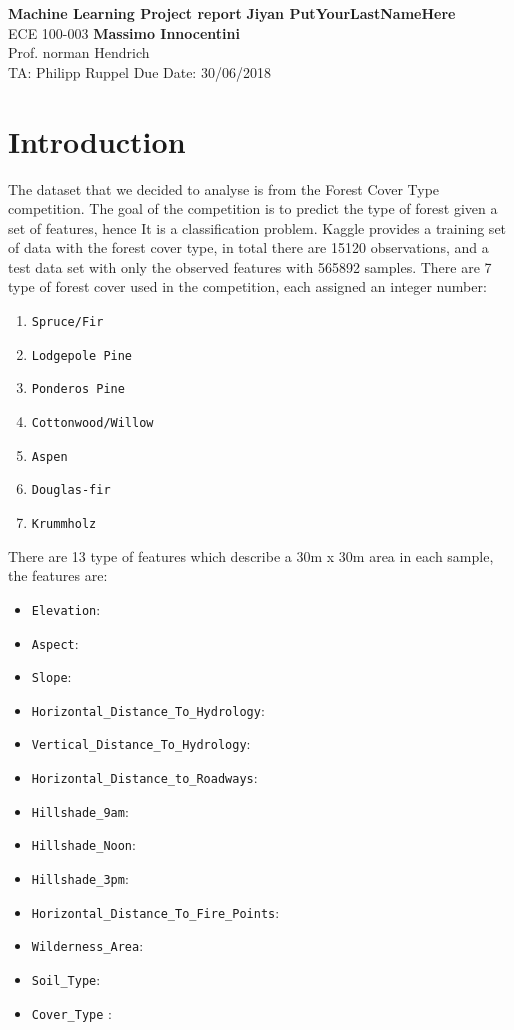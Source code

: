 \documentclass[a4paper, 11pt]{article}
\begin{document}
\noindent
\large\textbf{Machine Learning Project report} \hfill \textbf{Jiyan PutYourLastNameHere} \\
\normalsize ECE 100-003 \hfill \textbf{Massimo Innocentini} \\
Prof. norman Hendrich \\
TA: Philipp Ruppel \hfill Due Date: 30/06/2018

\section*{Introduction}
The dataset that we decided to analyse is from the Forest Cover Type competition. The goal of the competition is to predict the type of forest given a set of features, hence It is a classification problem. Kaggle provides a training set of data with the forest cover type, in total there are 15120 observations, and a test data set with only the observed features with 565892 samples. There are 7 type of forest cover used in the competition, each assigned an integer number: 

\begin{enumerate}
  \item \texttt{Spruce/Fir}
  \item \texttt{Lodgepole Pine}
  \item \texttt{Ponderos Pine}
  \item \texttt{Cottonwood/Willow}
  \item \texttt{Aspen}
  \item \texttt{Douglas-fir}
  \item \texttt{Krummholz}
\end{enumerate}

There are 13 type of features which describe a 30m x 30m area in each sample, the features are:

\begin{itemize}
  \item \texttt{Elevation}: 
  \item \texttt{Aspect}: 
  \item \texttt{Slope}: 
  \item \texttt{Horizontal\_Distance\_To\_Hydrology}: 
  \item \texttt{Vertical\_Distance\_To\_Hydrology}: 
  \item \texttt{Horizontal\_Distance\_to\_Roadways}: 
  \item \texttt{Hillshade\_9am}: 
  \item \texttt{Hillshade\_Noon}:
  \item \texttt{Hillshade\_3pm}:
  \item \texttt{Horizontal\_Distance\_To\_Fire\_Points}: 
  \item \texttt{Wilderness\_Area}: 
  \item \texttt{Soil\_Type}: 
  \item \texttt{Cover\_Type} :
\end{itemize} 
\end{document}
